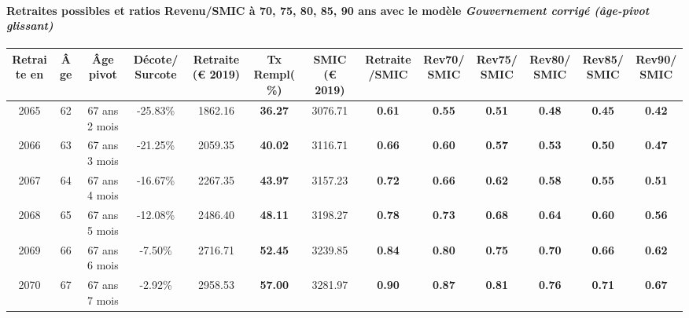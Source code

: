 \paragraph{Retraites possibles et ratios Revenu/SMIC à 70, 75, 80, 85, 90 ans avec le modèle \emph{Gouvernement corrigé (âge-pivot glissant)}}  
 
{ \scriptsize \begin{center} 
\begin{tabular}[htb]{|c|c||c|c||c|c||c||c|c|c|c|c|c|} 
\hline 
 Retraite en &  Âge &  Âge pivot &  Décote/Surcote &  Retraite (\euro{} 2019) &  Tx Rempl(\%) &  SMIC (\euro{} 2019) &  Retraite/SMIC &  Rev70/SMIC &  Rev75/SMIC &  Rev80/SMIC &  Rev85/SMIC &  Rev90/SMIC \\ 
\hline \hline 
 2065 &  62 &  67 ans 2 mois &  -25.83\% &  1862.16 &  {\bf 36.27} &  3076.71 &  {\bf {\color{red} 0.61}} &  {\bf {\color{red} 0.55}} &  {\bf {\color{red} 0.51}} &  {\bf {\color{red} 0.48}} &  {\bf {\color{red} 0.45}} &  {\bf {\color{red} 0.42}} \\ 
\hline 
 2066 &  63 &  67 ans 3 mois &  -21.25\% &  2059.35 &  {\bf 40.02} &  3116.71 &  {\bf {\color{red} 0.66}} &  {\bf {\color{red} 0.60}} &  {\bf {\color{red} 0.57}} &  {\bf {\color{red} 0.53}} &  {\bf {\color{red} 0.50}} &  {\bf {\color{red} 0.47}} \\ 
\hline 
 2067 &  64 &  67 ans 4 mois &  -16.67\% &  2267.35 &  {\bf 43.97} &  3157.23 &  {\bf {\color{red} 0.72}} &  {\bf {\color{red} 0.66}} &  {\bf {\color{red} 0.62}} &  {\bf {\color{red} 0.58}} &  {\bf {\color{red} 0.55}} &  {\bf {\color{red} 0.51}} \\ 
\hline 
 2068 &  65 &  67 ans 5 mois &  -12.08\% &  2486.40 &  {\bf 48.11} &  3198.27 &  {\bf {\color{red} 0.78}} &  {\bf {\color{red} 0.73}} &  {\bf {\color{red} 0.68}} &  {\bf {\color{red} 0.64}} &  {\bf {\color{red} 0.60}} &  {\bf {\color{red} 0.56}} \\ 
\hline 
 2069 &  66 &  67 ans 6 mois &  -7.50\% &  2716.71 &  {\bf 52.45} &  3239.85 &  {\bf {\color{red} 0.84}} &  {\bf {\color{red} 0.80}} &  {\bf {\color{red} 0.75}} &  {\bf {\color{red} 0.70}} &  {\bf {\color{red} 0.66}} &  {\bf {\color{red} 0.62}} \\ 
\hline 
 2070 &  67 &  67 ans 7 mois &  -2.92\% &  2958.53 &  {\bf 57.00} &  3281.97 &  {\bf {\color{red} 0.90}} &  {\bf {\color{red} 0.87}} &  {\bf {\color{red} 0.81}} &  {\bf {\color{red} 0.76}} &  {\bf {\color{red} 0.71}} &  {\bf {\color{red} 0.67}} \\ 
\hline 
\hline 
\end{tabular} 
\end{center} } 
